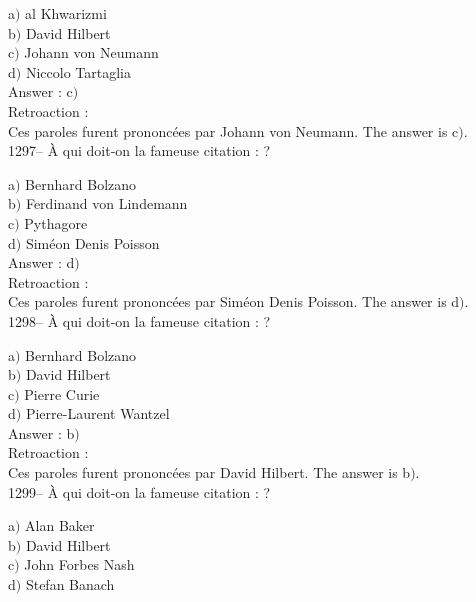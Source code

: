 ﻿\documentclass[letterpaper, 12pt]{article}
\begin{document}
a$)$ al Khwarizmi \\
b$)$ David Hilbert \\
c$)$ Johann von Neumann \\
d$)$ Niccolo Tartaglia\\

Answer : c$)$\\

Retroaction : \\
Ces paroles furent prononc\'ees par Johann von Neumann.
The answer is  c$)$.\\

1297-- \`A qui doit-on la fameuse citation : \fg ?

a$)$ Bernhard Bolzano \\
b$)$ Ferdinand von Lindemann \\
c$)$ Pythagore \\
d$)$ Sim\'eon Denis Poisson\\

Answer : d$)$\\

Retroaction : \\
Ces paroles furent prononc\'ees par Sim\'eon Denis Poisson.
The answer is  d$)$.\\

1298-- \`A qui doit-on la fameuse citation : \fg ?

a$)$ Bernhard Bolzano \\
b$)$ David Hilbert \\
c$)$ Pierre Curie \\
d$)$ Pierre-Laurent Wantzel\\

Answer : b$)$\\

Retroaction : \\
Ces paroles furent prononc\'ees par David Hilbert.
The answer is  b$)$.\\

1299-- \`A qui doit-on la fameuse citation : \fg?

a$)$ Alan Baker \\
b$)$ David Hilbert \\
c$)$ John Forbes Nash \\
d$)$ Stefan Banach\\
\end{document}
